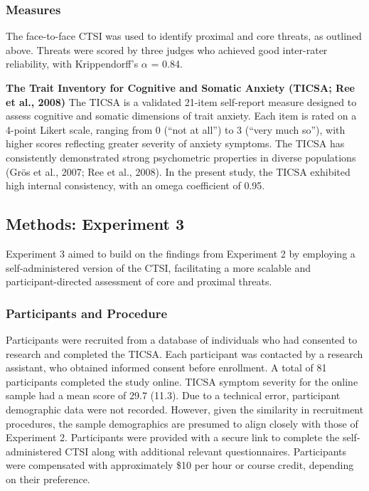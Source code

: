 \documentclass[
  man,floatsintext]{apa7}
\begin{document}
\subsubsection{Measures}\label{measures-2}

The face-to-face CTSI was used to identify proximal and core threats, as outlined above.
Threats were scored by three judges who achieved good inter-rater reliability, with Krippendorff's \(\alpha\) = 0.84.

\textbf{The Trait Inventory for Cognitive and Somatic Anxiety (TICSA; Ree et al., 2008)}
The TICSA is a validated 21-item self-report measure designed to assess cognitive and somatic dimensions of trait anxiety.
Each item is rated on a 4-point Likert scale, ranging from 0 (``not at all'') to 3 (``very much so''), with higher scores reflecting greater severity of anxiety symptoms.
The TICSA has consistently demonstrated strong psychometric properties in diverse populations (Grös et al., 2007; Ree et al., 2008).
In the present study, the TICSA exhibited high internal consistency, with an omega coefficient of 0.95.

\subsection{Methods: Experiment 3}\label{methods-experiment-3}

Experiment 3 aimed to build on the findings from Experiment 2 by employing a self-administered version of the CTSI, facilitating a more scalable and participant-directed assessment of core and proximal threats.

\subsubsection{Participants and Procedure}\label{participants-and-procedure}

Participants were recruited from a database of individuals who had consented to research and completed the TICSA.
Each participant was contacted by a research assistant, who obtained informed consent before enrollment.
A total of 81 participants completed the study online.
TICSA symptom severity for the online sample had a mean score of 29.7 (11.3).
Due to a technical error, participant demographic data were not recorded.
However, given the similarity in recruitment procedures, the sample demographics are presumed to align closely with those of Experiment 2.
Participants were provided with a secure link to complete the self-administered CTSI along with additional relevant questionnaires.
Participants were compensated with approximately \$10 per hour or course credit, depending on their preference.
\end{document}

